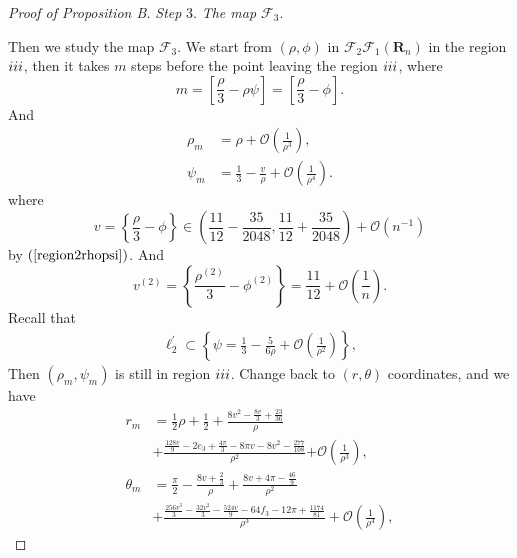 \documentclass{article}
\def \Rthree{\uppercase\expandafter{\romannumeral3}}
\numberwithin{figure}{section}
\numberwithin{equation}{section}
\theoremstyle{remark}
\theoremstyle{definition}
\begin{document}
\begin{proof}[Proof of Proposition B]
\emph{Step} 3. \emph{The map $\mathcal{F}_3$}.

Then we study the map $\mathcal{F}_3$. We start from $(\rho,\phi)$ in $\mathcal{F}_2\mathcal{F}_1(\mathbf{R}_n)$ in the region $\Rthree$, then it takes $m$ steps before the point leaving the region $\Rthree$, where
\begin{equation}
		m = \left\lbrack \frac{\rho}{3} - \rho\psi \right\rbrack=\left[\frac{\rho}{3}-\phi\right].
	\end{equation}
    And
\begin{equation}\label{cross3}
		\begin{split}
			\rho_{m} &= \rho + \mathcal{O}\left( \frac{1}{\rho^{3}} \right),\\
			\psi_{m} &= \frac{1}{3} - \frac{v}{\rho} + \mathcal{O}\left( \frac{1}{\rho^{4}} \right).
		\end{split}
	\end{equation}
 where 
 \begin{equation}\label{region3v}
 v=\left\{\frac{\rho}{3}-\phi\right\}\in\left(\frac{11}{12}-\frac{35}{2048},\frac{11}{12}+\frac{35}{2048}\right)+\mathcal{O}(n^{-1})
 \end{equation}
 by $(\ref{region2rhopsi})$. And 
    \begin{equation}\label{region3v0}
         v^{(2)}=\left\{\frac{\rho^{(2)}}{3}-\phi^{(2)}\right\}=\frac{11}{12}+\mathcal{O}\left(\frac{1}{n}\right).
    \end{equation}
    Recall that 
       \begin{align}
		\ell_{2}^{'} \subset \left\{ \psi = \frac{1}{3} - \frac{5}{6\rho} + \mathcal{O}\left( \frac{1}{\rho^{2}} \right) \right\},
	\end{align}
 Then $(\rho_m,\psi_m)$ is still in region $\Rthree$.
 Change back to $(r,\theta)$ coordinates, and we have
  \begin{equation}\label{inverse Taylor 3}
		\begin{split}
			r_{m} &= \frac{1}{2}\rho +\frac{1}{2}+\frac{8v^2 -\frac{8v}{3}+\frac{23}{36}}{\rho}  \\
            &+ \frac{\frac{128v}{9}-2e_3+\frac{4\pi }{3}-8\pi v-8v^2 -\frac{277}{108}}{\rho^{2}}\mathcal{+ O}\left( \frac{1}{\rho^{3}} \right),\\
			\theta_{m} &=\frac{\pi}{2} - \frac{8v+\frac{2}{3}}{\rho} + \frac{8v+4\pi -\frac{46}{9}}{\rho^{2}} \\
            &+\frac{\frac{256v^3 }{3}-\frac{32v^2 }{3}-\frac{524v}{9}-64f_3 -12\pi +\frac{1174}{81}}{\rho^{3}} + \mathcal{O}\left( \frac{1}{\rho^{4}} \right),

\end{split}
\end{equation}
\end{proof}
\end{document}
